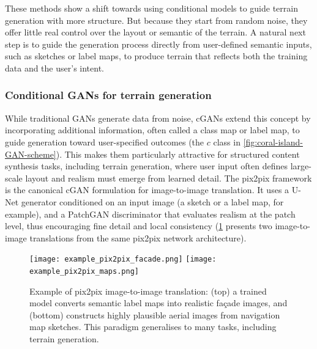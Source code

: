 These methods show a shift towards using conditional models to guide terrain generation with more structure. But because they start from random noise, they offer little real control over the layout or semantic of the terrain. A natural next step is to guide the generation process directly from user-defined semantic inputs, such as sketches or label maps, to produce terrain that reflects both the training data and the user's intent.


\subsubsection{Conditional GANs for terrain generation}
\label{sec:coral-island-sota-cGAN}

While traditional GANs generate data from noise, cGANs extend this concept by incorporating additional information, often called a class map or label map, to guide generation toward user-specified outcomes \cite{Mirza2014} (the $c$ class in \cref{fig:coral-island-GAN-scheme}). This makes them particularly attractive for structured content synthesis tasks, including terrain generation, where user input often defines large-scale layout and realism must emerge from learned detail. The pix2pix framework \cite{Isola2017} is the canonical cGAN formulation for image-to-image translation. It uses a U-Net generator conditioned on an input image (a sketch or a label map, for example), and a PatchGAN discriminator that evaluates realism at the patch level, thus encouraging fine detail and local consistency (\cref{fig:coral-island-pix2pix-example} presents two image-to-image translations from the same pix2pix network architecture).

\begin{figure}
    \texttt{[image: example\_pix2pix\_facade.png]}
    \texttt{[image: example\_pix2pix\_maps.png]}
    \caption[Examples of pix2pix use cases]{Example of pix2pix image-to-image translation: (top) a trained model converts semantic label maps into realistic façade images, and (bottom) constructs highly plausible aerial images from navigation map sketches. This paradigm generalises to many tasks, including terrain generation.}
    \label{fig:coral-island-pix2pix-example}
\end{figure}

